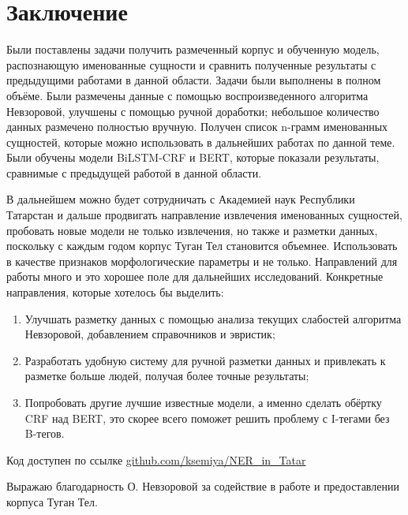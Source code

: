 \section{Заключение}

Были поставлены задачи получить размеченный корпус и обученную модель, распознающую именованные сущности и сравнить полученные результаты с предыдущими работами в данной области. Задачи были выполнены в полном объёме. Были размечены данные с помощью воспроизведенного алгоритма Невзоровой, улучшены с помощью ручной доработки; небольшое количество данных размечено полностью вручную. Получен список n-грамм именованных сущностей, которые можно использовать в дальнейших работах по данной теме. Были обучены модели BiLSTM-CRF и BERT, которые показали результаты, сравнимые с предыдущей работой в данной области. 

В дальнейшем можно будет сотрудничать с Академией наук Республики Татарстан и дальше продвигать направление извлечения именованных сущностей, пробовать новые модели не только извлечения, но также и разметки данных, поскольку с каждым годом корпус Туган Тел становится объемнее. Использовать в качестве признаков морфологические параметры и не только. Направлений для работы много и это хорошее поле для дальнейших исследований. Конкретные направления, которые хотелось бы выделить:

\begin{enumerate}
\item Улучшать разметку данных с помощью анализа текущих слабостей алгоритма Невзоровой, добавлением справочников и эвристик; 
\item Разработать удобную систему для ручной разметки данных и привлекать к разметке больше людей, получая более точные результаты;
\item Попробовать другие лучшие известные модели, а именно сделать обёртку CRF над BERT, это скорее всего поможет решить проблему с I-тегами без B-тегов.
\end{enumerate}

Код доступен по ссылке \href{https://github.com/ksemiya/NER\_in\_Tatar}{github.com/ksemiya/NER\_in\_Tatar}

Выражаю благодарность О. Невзоровой за содействие в работе и предоставлении корпуса Туган Тел.